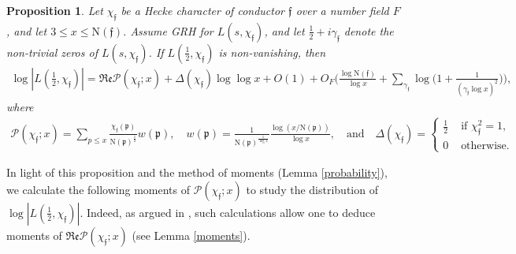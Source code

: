 \documentclass[11pt]{amsart}
\def\p{\mathfrak{p}}
\newcommand{\norm}{\mathrm{N}}
\newcommand{\oh}{\mbox{$\frac{1}{2}$}}
\newtheorem{prop}{Proposition}[section]
\numberwithin{equation}{section}
\renewcommand{\Re}{{\mathfrak{Re}}}
\theoremstyle{remark}
\begin{document}
\begin{prop}\label{Prop 1}
Let $\chi_\mathfrak{f}$ be a Hecke character of conductor $\mathfrak{f}$ over a number field $F$, and let $ 3\le x \le \norm( \mathfrak{f})$. Assume
GRH for $L(s,\chi_\mathfrak{f})$, and let $\frac{1}{2}+ i\gamma_\mathfrak{f} $ denote 
the non-trivial zeros of $ L(s,\chi_\mathfrak{f})$.  If  $L(\frac{1}{2}, \chi_\mathfrak{f})$ is non-vanishing, then
\begin{align}\label{exp-logL}
\log | L(\oh , \chi_\mathfrak{f})|
=  \Re \mathcal{P}(\chi_\mathfrak{f}; x) +\Delta(\chi_\mathfrak{f}) \log\log x +O(1)
+O_F\bigg( \frac{ \log \norm( \mathfrak{f})}{\log x}
+\sum_{\gamma_\mathfrak{f} } 
\log \bigg(1 + \frac{ 1 }{ (\gamma_\mathfrak{f} \log x)^2} \bigg)  \bigg),
\end{align}
where 
\begin{align}
\label{def Dirichlet polynomial}
    \mathcal{P}(\chi_\mathfrak{f}; x) = \sum_{p\le x} \frac{ \chi_\mathfrak{f}(\p)}{\norm(\p)^{\frac{1}{2}}} w(\p),
\quad
w(\p) = \frac{1}{\norm(\p)^{\frac{1}{\log x}}}   \frac{\log (x/\norm(\p))}{\log x}, 
\quad\text{and}\quad
\Delta(\chi_\mathfrak{f}) =
\begin{cases}
    \frac{1}{2} &\text{ if } \chi_\mathfrak{f}^2 =1,\\
    0 &\text{ otherwise.}
\end{cases}
\end{align}
\end{prop}

In light of this proposition and the method of moments (Lemma \ref{probability}), we calculate the following moments of $\mathcal{P}(\chi_\mathfrak{f}; x)$ to study the distribution of $\log | L(\oh , \chi_\mathfrak{f})|$. Indeed, as argued in \cite[Sec. 5]{HW}, such calculations allow one to deduce moments of $\Re \mathcal{P}(\chi_\mathfrak{f}; x) $ (see Lemma \ref{moments}).
\end{document}
